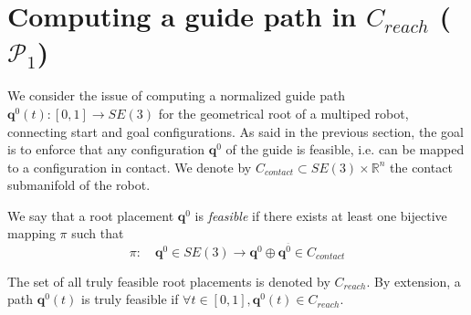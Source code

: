 \section{Computing a guide path in $C_{reach}$ ($\mathcal{P}_1$) }
\label{rbprm}

We consider the issue of computing a normalized guide path $\mathbf{q}^0(t) : [0,1] \longrightarrow SE(3)$ for the geometrical  root of a multiped robot, connecting  start and goal configurations. As said in the previous section, the goal is to enforce that any configuration $\mathbf{q}^0$ of the guide is  feasible, i.e. can be mapped to a configuration in contact. We denote by $C_{contact} \subset SE(3) \times \mathbb{R}^n$ the contact submanifold of the robot.

We say that a root placement $\mathbf{q}^{0}$ is \textit{ feasible} if there exists at least one bijective mapping $\pi$
such that
\begin{equation}
    \pi\colon \quad \mathbf{q}^{0} \in  SE(3) \longrightarrow  \mathbf{q}^{0} \oplus \mathbf{q}^{\overline{0}} \in C_{contact} 
    \label{eq:pi}
\end{equation}

The set of all truly feasible root placements is denoted by $C_{reach}$. By extension, a path $\mathbf{q}^0(t)$ is truly feasible if $\forall t \in [0,1], \mathbf{q}^0(t) \in C_{reach}$.

